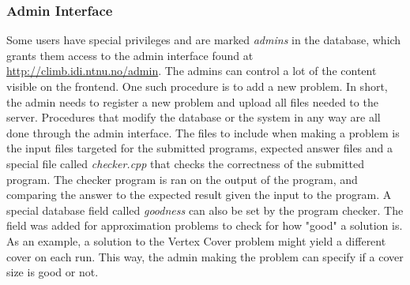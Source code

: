 \subsubsection{Admin Interface} Some users have special privileges and are marked \textit{admins} in the database, which grants them access to the admin interface found at \url{http://climb.idi.ntnu.no/admin}. The admins can control a lot of the content visible on the frontend. One such procedure is to add a new problem. In short, the admin needs to register a new problem and upload all files needed to the server.  Procedures that modify the database or the system in any way are all done through the admin interface. The files to include when making a problem is the input files targeted for the submitted programs, expected answer files and a special file called \textit{checker.cpp} that checks the correctness of the submitted program. The checker program is ran on the output of the program, and comparing the answer to the expected result given the input to the program. A special database field called \textit{goodness} can also be set by the program checker. The field was added for approximation problems to check for how "good" a solution is. As an example, a solution to the Vertex Cover problem might yield a different cover on each run. This way, the admin making the problem can specify if a cover size is good or not.

